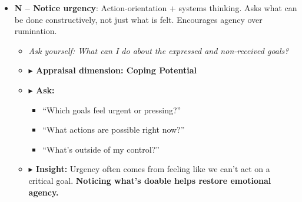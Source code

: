 \documentclass{article}
\begin{document}
\begin{itemize}[noitemsep,topsep=0pt]
    \item \textbf{N – Notice urgency}: Action-orientation + systems thinking. Asks what can be done constructively, not just what is felt. Encourages agency over rumination.
    \begin{itemize}[noitemsep,topsep=0pt]
        \item \textit{Ask yourself: What can I do about the expressed and non-received goals?}
        \item \textbf{$\blacktriangleright$ Appraisal dimension: Coping Potential}
        \item \textbf{$\blacktriangleright$ Ask:}
        \begin{itemize}[noitemsep,topsep=0pt]
            \item “Which goals feel urgent or pressing?”
            \item “What actions are possible right now?”
            \item “What’s outside of my control?”
        \end{itemize}
        \item \textbf{$\blacktriangleright$ Insight:} Urgency often comes from feeling like we can't act on a critical goal. \textbf{Noticing what’s doable helps restore emotional agency.}
    \end{itemize}


\end{itemize}
\end{document}
